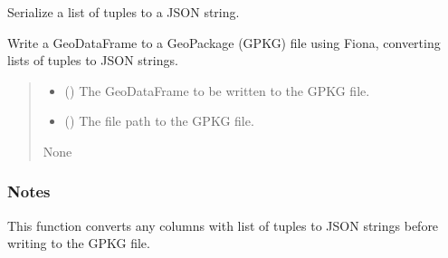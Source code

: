 \documentclass[letterpaper,10pt,english]{sphinxmanual}
\begin{document}

\begin{fulllineitems}
\label{\detokenize{pysewer:pysewer.export.tuple_list_to_json}}
\pysigstartsignatures
{}
\pysigstopsignatures
\sphinxAtStartPar
Serialize a list of tuples to a JSON string.

\end{fulllineitems}


\begin{fulllineitems}
\label{\detokenize{pysewer:pysewer.export.write_gdf_to_gpkg}}
\pysigstartsignatures
{}
\pysigstopsignatures
\sphinxAtStartPar
Write a GeoDataFrame to a GeoPackage (GPKG) file using Fiona, converting lists of tuples to JSON strings.
\begin{quote}\begin{description}
\begin{itemize}
\item {} 
\sphinxAtStartPar
{} () \textendash{} The GeoDataFrame to be written to the GPKG file.

\item {} 
\sphinxAtStartPar
{} () \textendash{} The file path to the GPKG file.

\end{itemize}

\sphinxAtStartPar
None

\end{description}\end{quote}
\subsubsection*{Notes}

\sphinxAtStartPar
This function converts any columns with list of tuples to JSON strings before writing to the GPKG file.

\end{fulllineitems}
\end{document}
